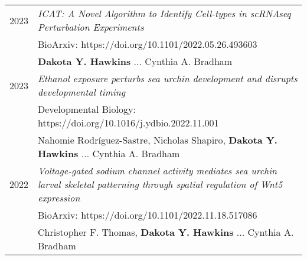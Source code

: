 \documentclass[a4paper,10pt]{article}
\begin{document}
\section{\color{linkcolour}{Publications}}
\begin{tabular}{rp{10cm}}
	\textsc{2023} & \emph{ICAT: A Novel Algorithm to Identify Cell-types in scRNAseq Perturbation Experiments}                                                \\
	              & BioArxiv: https://doi.org/10.1101/2022.05.26.493603                                                                                       \\
	              & \small{\textbf{Dakota Y. Hawkins} ... Cynthia A. Bradham}                                                                                 \\
	\textsc{2023} & \emph{Ethanol exposure perturbs sea urchin development and disrupts developmental timing}                                                 \\
	              & Developmental Biology: https://doi.org/10.1016/j.ydbio.2022.11.001                                                                        \\
	              & \small{Nahomie Rodríguez-Sastre, Nicholas Shapiro, \textbf{Dakota Y. Hawkins} ... Cynthia A. Bradham}                                     \\
	\textsc{2022} & \emph{Voltage-gated sodium channel activity mediates sea urchin larval skeletal patterning through spatial regulation of Wnt5 expression} \\
	              & BioArxiv: https://doi.org/10.1101/2022.11.18.517086                                                                                       \\
	              & \small{Christopher F. Thomas, \textbf{Dakota Y. Hawkins} ... Cynthia A. Bradham}                                                          \\
\end{tabular}

\end{document}
